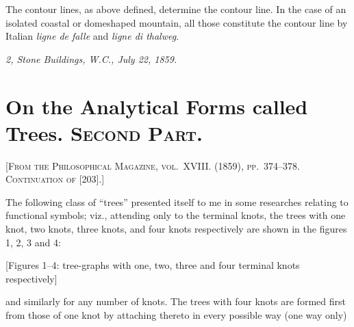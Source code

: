 \documentclass[11pt,a4paper]{article}
\begin{document}
The contour lines, as above defined, determine the contour line. In the case of an isolated coastal or domeshaped mountain, all those constitute the contour line by Italian \textit{ligne de falle} and \textit{ligne di thalweg}.

\smallskip
\noindent\textit{2, Stone Buildings, W.C., July 22, 1859.}

\newpage


\setcounter{page}{112}

\section*{On the Analytical Forms called Trees. \textsc{Second Part.}}
\label{paper:247}

\textsc{[From the Philosophical Magazine, vol.~XVIII. (1859), pp.~374--378. Continuation of [203].]}

\medskip

The following class of ``trees'' presented itself to me in some researches relating to functional symbols; viz., attending only to the terminal knots, the trees with one knot, two knots, three knots, and four knots respectively are shown in the figures 1, 2, 3 and 4:

\begin{center}
[Figures 1--4: tree-graphs with one, two, three and four terminal knots respectively]
\end{center}

\noindent
and similarly for any number of knots. The trees with four knots are formed first from those of one knot by attaching thereto in every possible way (one way only)

\setcounter{page}{113}
\end{document}

